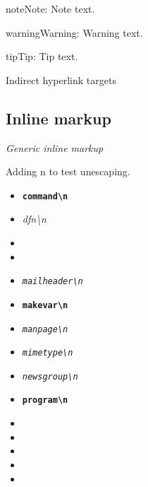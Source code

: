 \documentclass[letterpaper,10pt,english]{sphinxhowto}
\begin{document}
\begin{notice}{note}{Note:}
Note text.
\end{notice}

\begin{notice}{warning}{Warning:}
Warning text.
\end{notice}
\label{markup:some-label}
\begin{notice}{tip}{Tip:}
Tip text.
\end{notice}

Indirect hyperlink targets


\subsection{Inline markup}
\label{markup:inline-markup}\label{markup:other-label}\label{markup:some-label}
\emph{Generic inline markup}

Adding n to test unescaping.
\begin{itemize}
\item {} 
\textbf{\texttt{command\textbackslash{}n}}

\item {} 
\emph{dfn\textbackslash{}n}

\item {} 

\item {} 

\item {} 
\emph{\texttt{mailheader\textbackslash{}n}}

\item {} 
\textbf{\texttt{makevar\textbackslash{}n}}

\item {} 
\emph{\texttt{manpage\textbackslash{}n}}

\item {} 
\emph{\texttt{mimetype\textbackslash{}n}}

\item {} 
\emph{\texttt{newsgroup\textbackslash{}n}}

\item {} 
\textbf{\texttt{program\textbackslash{}n}}

\item {} 

\item {} 

\item {} 

\item {} 

\item {} 

\end{itemize}
\end{document}

